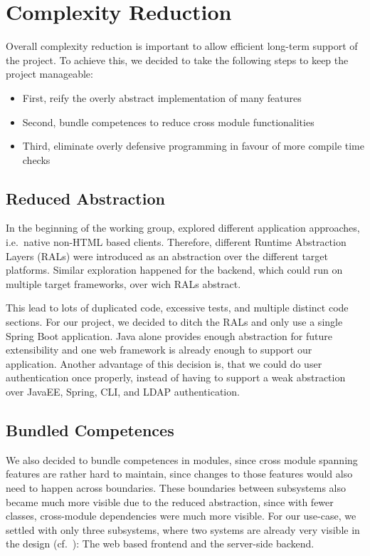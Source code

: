 \section{Complexity Reduction}\label{sec:complexityReduction}
Overall complexity reduction is important to allow efficient long-term support of the project.
To achieve this, we decided to take the following steps to keep the project manageable:
\begin{itemize}
    \item First, reify the overly abstract implementation of many features
    \item Second, bundle competences to reduce cross module functionalities
    \item Third, eliminate overly defensive programming in favour of more compile time checks
\end{itemize}

\subsection*{Reduced Abstraction}
In the beginning of the working group, \citet{maier2015multidevice} explored different application approaches, i.e.\
native non-HTML based clients.
Therefore, different Runtime Abstraction Layers (RALs) were introduced as an abstraction over the different target
platforms.
Similar exploration happened for the backend, which could run on multiple target frameworks, over wich RALs abstract.

This lead to lots of duplicated code, excessive tests, and multiple distinct  code sections.
For our project, we decided to ditch the RALs and only use a single Spring Boot application.
Java alone provides enough abstraction for future extensibility and one web framework is already enough to support our
application.
Another advantage of this decision is, that we could do user authentication once properly, instead of having to support
a weak abstraction over JavaEE, Spring, CLI, and LDAP authentication.

\subsection*{Bundled Competences}
We also decided to bundle competences in modules, since cross module spanning features are rather hard to maintain,
since changes to those features would also need to happen across boundaries.
These boundaries between subsystems also became much more visible due to the reduced abstraction, since with fewer
classes, cross-module dependencies were much more visible.
For our use-case, we settled with only three subsystems, where two systems are already very visible in the design
(cf.\ \Cref{fig:systemArchitecture}): The web based frontend and the server-side backend.

